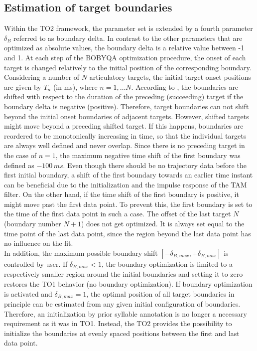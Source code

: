 \subsection{Estimation of target boundaries}
Within the TO2 framework, the parameter set is extended by a fourth parameter $\delta_{B}$ referred to as boundary delta. In contrast to the other parameters that are optimized as absolute values, the boundary delta is a relative value between -1 and 1. At each step of the BOBYQA optimization procedure, the onset of each target is changed relatively to the initial position of the corresponding boundary. Considering a number of $N$ articulatory targets, the initial target onset positions are given by $T_{n}$ (in ms), where $n=1,\dots N$. According to \cite{TO2}, the boundaries are shifted with respect to the duration of the preceding (succeeding) target if the boundary delta is negative (positive). Therefore, target boundaries can not shift beyond the initial onset boundaries of adjacent targets. However, shifted targets might move beyond a preceding shifted target. If this happens, boundaries are reordered to be monotonically increasing in time, so that the individual targets are always well defined and never overlap. Since there is no preceding target in the case of $n=1$, the maximum negative time shift of the first boundary was defined as $-100\,ms$. Even though there should be no trajectory data before the first initial boundary, a shift of the first boundary towards an earlier time instant can be beneficial due to the initialization and the impulse response of the TAM filter. On the other hand, if the time shift of the first boundary is positive, it might move past the first data point. To prevent this, the first boundary is set to the time of the first data point in such a case. The offset of the last target $N$ (boundary number $N+1$) does not get optimized. It is always set equal to the time point of the last data point, since the region beyond the last data point has no influence on the fit.\\
In addition, the maximum possible boundary shift $[-\delta_{B,max},+\delta_{B,max}]$ is controlled by user. If $\delta_{B,max}<1$, the boundary optimization is limited to a respectively smaller region around the initial boundaries and setting it to zero restores the TO1 behavior (no boundary optimization). If boundary optimization is activated and $\delta_{B,max}=1$, the optimal position of all target boundaries in principle can be estimated from any given initial configuration of boundaries. Therefore, an initialization by prior syllable annotation is no longer a necessary requirement as it was in TO1. Instead, the TO2 provides the possibility to initialize the boundaries at evenly spaced positions between the first and last data point.

